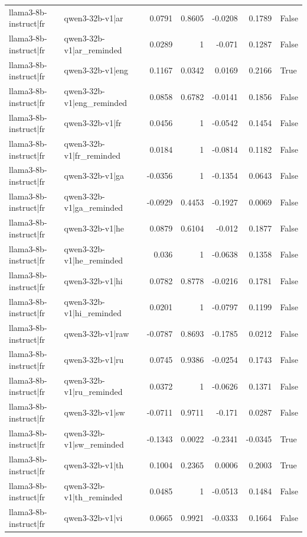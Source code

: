 \begin{table}
\begin{tabular}{l l r r r r l}
llama3-8b-instruct|fr & qwen3-32b-v1|ar & 0.0791 & 0.8605 & -0.0208 & 0.1789 & False \\
llama3-8b-instruct|fr & qwen3-32b-v1|ar_reminded & 0.0289 & 1 & -0.071 & 0.1287 & False \\
llama3-8b-instruct|fr & qwen3-32b-v1|eng & 0.1167 & 0.0342 & 0.0169 & 0.2166 & True \\
llama3-8b-instruct|fr & qwen3-32b-v1|eng_reminded & 0.0858 & 0.6782 & -0.0141 & 0.1856 & False \\
llama3-8b-instruct|fr & qwen3-32b-v1|fr & 0.0456 & 1 & -0.0542 & 0.1454 & False \\
llama3-8b-instruct|fr & qwen3-32b-v1|fr_reminded & 0.0184 & 1 & -0.0814 & 0.1182 & False \\
llama3-8b-instruct|fr & qwen3-32b-v1|ga & -0.0356 & 1 & -0.1354 & 0.0643 & False \\
llama3-8b-instruct|fr & qwen3-32b-v1|ga_reminded & -0.0929 & 0.4453 & -0.1927 & 0.0069 & False \\
llama3-8b-instruct|fr & qwen3-32b-v1|he & 0.0879 & 0.6104 & -0.012 & 0.1877 & False \\
llama3-8b-instruct|fr & qwen3-32b-v1|he_reminded & 0.036 & 1 & -0.0638 & 0.1358 & False \\
llama3-8b-instruct|fr & qwen3-32b-v1|hi & 0.0782 & 0.8778 & -0.0216 & 0.1781 & False \\
llama3-8b-instruct|fr & qwen3-32b-v1|hi_reminded & 0.0201 & 1 & -0.0797 & 0.1199 & False \\
llama3-8b-instruct|fr & qwen3-32b-v1|raw & -0.0787 & 0.8693 & -0.1785 & 0.0212 & False \\
llama3-8b-instruct|fr & qwen3-32b-v1|ru & 0.0745 & 0.9386 & -0.0254 & 0.1743 & False \\
llama3-8b-instruct|fr & qwen3-32b-v1|ru_reminded & 0.0372 & 1 & -0.0626 & 0.1371 & False \\
llama3-8b-instruct|fr & qwen3-32b-v1|sw & -0.0711 & 0.9711 & -0.171 & 0.0287 & False \\
llama3-8b-instruct|fr & qwen3-32b-v1|sw_reminded & -0.1343 & 0.0022 & -0.2341 & -0.0345 & True \\
llama3-8b-instruct|fr & qwen3-32b-v1|th & 0.1004 & 0.2365 & 0.0006 & 0.2003 & True \\
llama3-8b-instruct|fr & qwen3-32b-v1|th_reminded & 0.0485 & 1 & -0.0513 & 0.1484 & False \\
llama3-8b-instruct|fr & qwen3-32b-v1|vi & 0.0665 & 0.9921 & -0.0333 & 0.1664 & False \\

\end{tabular}
\end{table}

